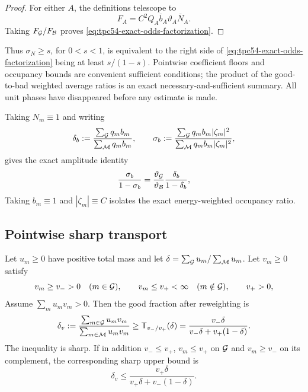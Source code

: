 \begin{proof}
For either \(A\), the definitions telescope to
\[
 F_A=C^2Q_A\overline b_A\vartheta_A\overline N_A.
\]
Taking \(F_{\mathcal G}/F_{\mathcal B}\) proves
\eqref{eq:tpc54-exact-odds-factorization}.
\end{proof}

Thus \(\sigma_N\ge s\), for \(0<s<1\), is equivalent to the right side
of \eqref{eq:tpc54-exact-odds-factorization} being at least
\(s/(1-s)\).  Pointwise coefficient floors and occupancy bounds are
convenient sufficient conditions; the product of the good-to-bad weighted
average ratios is an exact necessary-and-sufficient summary.  All unit
phases have disappeared before any estimate is made.

Taking \(N_m\equiv1\) and writing
\[
 \delta_b:=\frac{\sum_{\mathcal G}q_mb_m}{\sum_{\mathcal M}q_mb_m},
 \qquad
 \sigma_b:=\frac{\sum_{\mathcal G}q_mb_m|\zeta_m|^2}
                  {\sum_{\mathcal M}q_mb_m|\zeta_m|^2},
\]
gives the exact amplitude identity
\begin{equation}
 \frac{\sigma_b}{1-\sigma_b}
 =\frac{\vartheta_{\mathcal G}}{\vartheta_{\mathcal B}}
  \frac{\delta_b}{1-\delta_b},
 \label{eq:tpc54-exact-amplitude-odds}
\end{equation}
Taking \(b_m\equiv1\) and \(|\zeta_m|\equiv C\) isolates the exact
energy-weighted occupancy ratio.

\subsection{Pointwise sharp transport}

\begin{theorem}
\label{thm:tpc54-transport}
 Let \(u_m\ge0\) have positive total mass and let
\(\delta=\sum_{\mathcal G}u_m/\sum_{\mathcal M}u_m\).  Let \(v_m\ge0\) satisfy
\begin{equation}
 v_m\ge v_->0\quad(m\in\mathcal G),
 \qquad
 v_m\le v_+<\infty\quad(m\notin\mathcal G),
 \qquad v_+>0,
 \label{eq:tpc54-multiplier-bounds}
\end{equation}
Assume \(\sum_m u_mv_m>0\).  Then the good fraction after reweighting is
\begin{equation}
 \delta_v:=\frac{\sum_{m\in\mathcal G}u_mv_m}
                   {\sum_{m\in\mathcal M}u_mv_m}
 \ge
 \mathsf T_{v_-/v_+}(\delta)
 =\frac{v_-\delta}{v_-\delta+v_+(1-\delta)}.
 \label{eq:tpc54-transport}
\end{equation}
The inequality is sharp.  If in addition \(v_-\le v_+\),
\(v_m\le v_+\) on \(\mathcal G\) and \(v_m\ge v_-\) on its complement, the
corresponding sharp upper bound is
\begin{equation}
 \delta_v\le
 \frac{v_+\delta}{v_+\delta+v_-(1-\delta)}.
 \label{eq:tpc54-transport-upper}
\end{equation}
\end{theorem}

